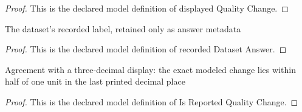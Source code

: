 \begin{proof}
  This is the declared model definition of displayed Quality Change.
\end{proof}
\begin{definition}
  \label{def:physics:phyx-mini-0444:phyxminiproblems-problemphyxmini0444-recordeddatasetanswer}
  The dataset's recorded label, retained only as answer metadata
\end{definition}
\begin{proof}
  This is the declared model definition of recorded Dataset Answer.
\end{proof}
\begin{definition}
  \label{def:physics:phyx-mini-0444:phyxminiproblems-problemphyxmini0444-isreportedqualitychange}
  Agreement with a three-decimal display: the exact modeled change lies within half of one unit in the last printed decimal place
\end{definition}
\begin{proof}
  This is the declared model definition of Is Reported Quality Change.
\end{proof}

